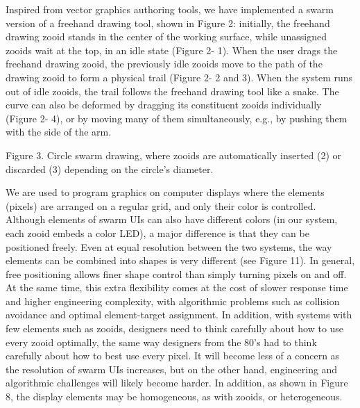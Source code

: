 



Inspired from vector graphics authoring tools, we have implemented a swarm version of a freehand drawing tool, shown in Figure 2: initially, the freehand drawing zooid stands in the center of the working surface, while unassigned zooids wait at the top, in an idle state (Figure 2- 1). When the user drags the freehand drawing zooid, the previously idle zooids move to the path of the drawing zooid to form a physical trail (Figure 2- 2 and 3). When the system runs out of idle zooids, the trail follows the freehand drawing tool like a snake. The curve can also be deformed by dragging its constituent zooids individually (Figure 2- 4), or by moving many of them simultaneously, e.g., by pushing them with the side of the arm.

Figure 3. Circle swarm drawing, where zooids are automatically inserted (2) or discarded (3) depending on the circle’s diameter.



We are used to program graphics on computer displays where the elements (pixels) are arranged on a regular grid, and only their color is controlled. Although elements of swarm UIs can also have different colors (in our system, each zooid embeds a color LED), a major difference is that they can be positioned freely. Even at equal resolution between the two systems, the way elements can be combined into shapes is very different (see Figure 11). In general, free positioning allows finer shape control than simply turning pixels on and off. At the same time, this extra flexibility comes at the cost of slower response time and higher engineering complexity, with algorithmic problems such as collision avoidance and optimal element-target assignment. In addition, with systems with few elements such as zooids, designers need to think carefully about how to use every zooid optimally, the same way designers from the 80’s had to think carefully about how to best use every pixel. It will become less of a concern as the resolution of swarm UIs increases, but on the other hand, engineering and algorithmic challenges will likely become harder. In addition, as shown in Figure 8, the display elements may be homogeneous, as with zooids, or heterogeneous.